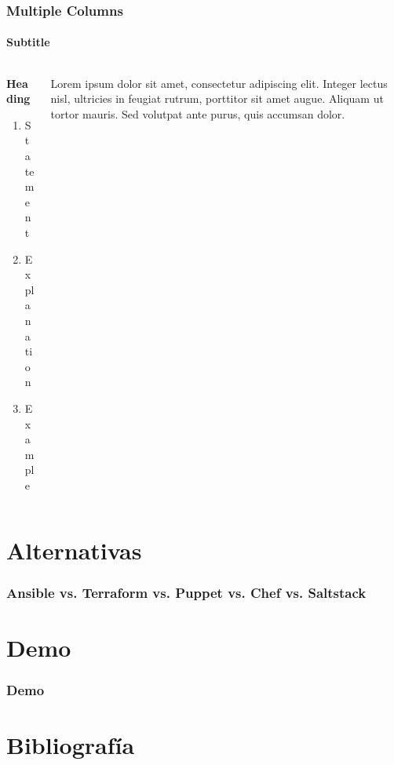 \documentclass[
	11pt, %
]{beamer}
\begin{document}

\begin{frame}
	\frametitle{Multiple Columns}
	\framesubtitle{Subtitle} %
	
	\begin{columns}[c] %
		\begin{column}{0.45\textwidth} %
			\textbf{Heading}
			\begin{enumerate}
				\item Statement
				\item Explanation
				\item Example
			\end{enumerate}
		\end{column}
		\begin{column}{0.5\textwidth} %
			Lorem ipsum dolor sit amet, consectetur adipiscing elit. Integer lectus nisl, ultricies in feugiat rutrum, porttitor sit amet augue. Aliquam ut tortor mauris. Sed volutpat ante purus, quis accumsan dolor.
		\end{column}
	\end{columns}
\end{frame}

\section{Alternativas}

\begin{frame}
	\frametitle{Ansible vs. Terraform vs. Puppet vs. Chef vs. Saltstack}
	
	

\end{frame}


\section{Demo}

\begin{frame}
	\frametitle{Demo}
	
\end{frame}


\section{Bibliografía}
\end{document}

